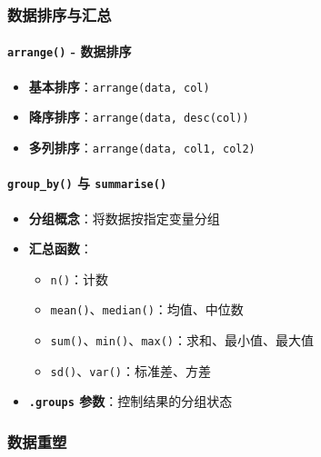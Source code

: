 \documentclass[
  twoside]{book}
\providecommand{\tightlist}{%
  \setlength{\itemsep}{0pt}\setlength{\parskip}{0pt}}
\begin{document}
\hypertarget{ux6570ux636eux6392ux5e8fux4e0eux6c47ux603b}{%
\subsubsection{数据排序与汇总}\label{ux6570ux636eux6392ux5e8fux4e0eux6c47ux603b}}

\hypertarget{arrange---ux6570ux636eux6392ux5e8f}{%
\paragraph{\texorpdfstring{\texttt{arrange()} - 数据排序}{arrange() - 数据排序}}\label{arrange---ux6570ux636eux6392ux5e8f}}

\begin{itemize}
\tightlist
\item
  \textbf{基本排序}：\texttt{arrange(data,\ col)}
\item
  \textbf{降序排序}：\texttt{arrange(data,\ desc(col))}
\item
  \textbf{多列排序}：\texttt{arrange(data,\ col1,\ col2)}
\end{itemize}

\hypertarget{group_by-ux4e0e-summarise}{%
\paragraph{\texorpdfstring{\texttt{group\_by()} 与 \texttt{summarise()}}{group\_by() 与 summarise()}}\label{group_by-ux4e0e-summarise}}

\begin{itemize}
\tightlist
\item
  \textbf{分组概念}：将数据按指定变量分组
\item
  \textbf{汇总函数}：

  \begin{itemize}
  \tightlist
  \item
    \texttt{n()}：计数
  \item
    \texttt{mean()}、\texttt{median()}：均值、中位数
  \item
    \texttt{sum()}、\texttt{min()}、\texttt{max()}：求和、最小值、最大值
  \item
    \texttt{sd()}、\texttt{var()}：标准差、方差
  \end{itemize}
\item
  \textbf{\texttt{.groups} 参数}：控制结果的分组状态
\end{itemize}

\hypertarget{ux6570ux636eux91cdux5851}{%
\subsubsection{数据重塑}\label{ux6570ux636eux91cdux5851}}
\end{document}
